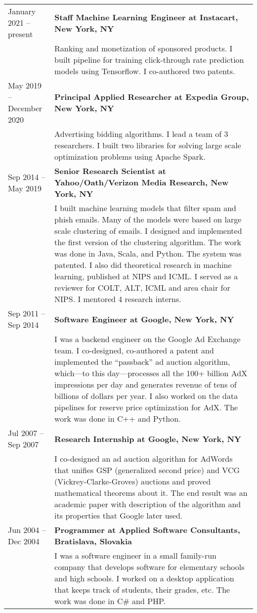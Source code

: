 \documentclass[9pt]{article}
\newcommand{\smallfont}{\small}
\begin{document}
\begin{longtable}{@{}lp{13cm}}
January 2021 -- present & \textbf{Staff Machine Learning Engineer at Instacart, New York, NY} \\
& {\smallfont Ranking and monetization of sponsored products.
I built pipeline for training click-through rate prediction models using Tensorflow. I co-authored two patents.}
\\[0.3cm]
May 2019 -- December 2020 & \textbf{Principal Applied Researcher at Expedia Group, New York, NY} \\
& {\smallfont Advertising bidding algorithms. I lead a team of 3 researchers.
I built two libraries for solving large scale optimization problems using Apache Spark.}
\\[0.3cm]
Sep 2014 -- May 2019 & \textbf{Senior Research Scientist at Yahoo/Oath/Verizon Media Research, New York, NY} \\
& {\smallfont I built machine learning models that filter spam and phish emails.
Many of the models were based on large scale clustering of emails. I designed and
implemented the first version of the clustering algorithm. The work was done in
Java, Scala, and Python. The system was patented. I also did theoretical
research in machine learning, published at NIPS and ICML. I served as a reviewer for COLT, ALT,
ICML and area chair for NIPS. I mentored 4 research interns.}
\\[0.3cm]
Sep 2011 -- Sep 2014 & \textbf{Software Engineer at Google, New York, NY} \\
& {\smallfont I was a backend engineer on the Google Ad Exchange team. I
co-designed, co-authored a patent and implemented the ``passback'' ad auction algorithm,
which---to this day---processes all the 100+ billion AdX impressions per day and
generates revenue of tens of billions of dollars per year. I also worked on the
data pipelines for reserve price optimization for AdX. The work was done in C++
and Python.}
\\[0.3cm]
Jul 2007 -- Sep 2007 & \textbf{Research Internship at Google, New York, NY} \\
& {\smallfont I co-designed an ad auction algorithm for AdWords that unifies GSP
(generalized second price) and VCG (Vickrey-Clarke-Groves) auctions and proved
mathematical theorems about it. The end result was an academic paper with description
of the algorithm and its properties that Google later used.}
\\[0.3cm]
Jun 2004 -- Dec 2004 & \textbf{Programmer at Applied Software Consultants, Bratislava, Slovakia} \\
& {\smallfont I was a software engineer in a small family-run company that
develops software for elementary schools and high schools. I worked on a desktop
application that keeps track of students, their grades, etc. The work was done in
C\# and PHP.}
\end{longtable}
\end{document}
